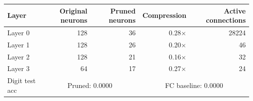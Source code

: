 \begin{tabular}{lrrrr}
\toprule
Layer & Original neurons & Pruned neurons & Compression & Active connections \\
\midrule
Layer 0 & 128 & 36 & 0.28$\times$ & 28224 \\
Layer 1 & 128 & 26 & 0.20$\times$ & 46 \\
Layer 2 & 128 & 21 & 0.16$\times$ & 32 \\
Layer 3 & 64 & 17 & 0.27$\times$ & 24 \\
\midrule
Digit test acc & \multicolumn{2}{c}{Pruned: 0.0000} & \multicolumn{2}{c}{FC baseline: 0.0000} \\
\bottomrule
\end{tabular}